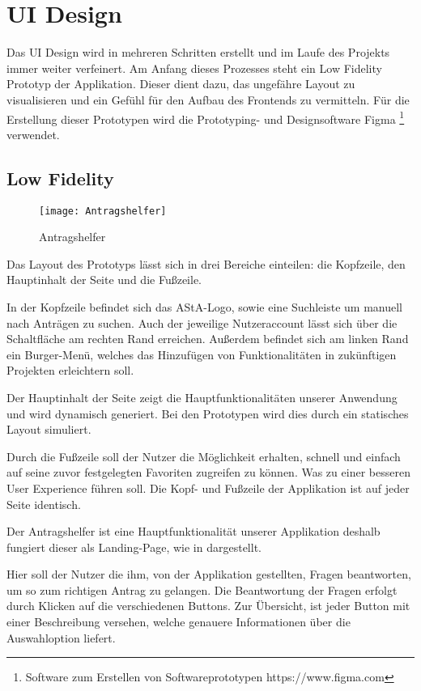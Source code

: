 \chapter{\ac{UI} Design}\label{ch:ui-design}
Das \ac{UI} Design wird in mehreren Schritten erstellt und im Laufe des Projekts immer weiter
verfeinert. Am Anfang dieses Prozesses steht ein Low Fidelity Prototyp der Applikation.
Dieser dient dazu, das ungefähre Layout zu visualisieren und ein Gefühl für den Aufbau
des Frontends zu vermitteln. %
Für die Erstellung dieser Prototypen wird die Prototyping- und
Designsoftware Figma \footnote{Software zum Erstellen von Softwareprototypen https://www.figma.com} verwendet.

\section{Low Fidelity}\label{Low Fidelity}
\begin{figure}[h]
\centering
\texttt{[image: Antragshelfer]}
\caption{Antragshelfer}\label{Antragshelfer}
\end{figure}
Das Layout des Prototyps lässt sich in drei Bereiche einteilen:
die Kopfzeile, den Hauptinhalt der Seite und die Fußzeile.

In der Kopfzeile befindet sich das \ac{AStA}-Logo, sowie eine Suchleiste um manuell nach
Anträgen zu suchen.
Auch der jeweilige Nutzeraccount lässt sich über die Schaltfläche
am rechten Rand erreichen.
Außerdem befindet sich am linken Rand ein Burger-Menü,
welches das Hinzufügen von Funktionalitäten in zukünftigen Projekten erleichtern soll.

Der Hauptinhalt der Seite zeigt die Hauptfunktionalitäten unserer Anwendung und wird
dynamisch generiert. Bei den Prototypen wird dies
durch ein statisches Layout simuliert.

Durch die Fußzeile soll der Nutzer die Möglichkeit erhalten, schnell und einfach auf
seine zuvor festgelegten Favoriten zugreifen zu können.
Was zu einer besseren User Experience führen soll.
Die Kopf- und Fußzeile der Applikation ist auf jeder Seite identisch.

Der Antragshelfer ist eine Hauptfunktionalität unserer Applikation deshalb fungiert
dieser als Landing-Page, wie in  dargestellt.

Hier soll der Nutzer die ihm, von der Applikation gestellten, Fragen beantworten,
um so zum richtigen Antrag zu gelangen. %
Die Beantwortung der Fragen erfolgt durch Klicken auf die verschiedenen Buttons. %
Zur Übersicht, ist jeder Button mit einer Beschreibung versehen, welche genauere Informationen über die Auswahloption liefert.

